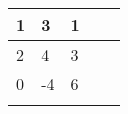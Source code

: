\begin{table}[]
\begin{tabular}{|l|l|l|l|l|}
\hline
\multicolumn{1}{|c|}{1} & 3  & 1 &  &  \\ \hline
2                       & 4  & 3 &  &  \\ \hline
0                       & -4 & 6 &  &  \\ \hline
                        &    &   &  &  \\ \hline
\end{tabular}
\end{table}
